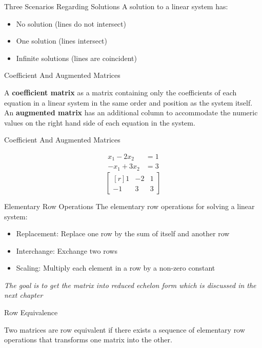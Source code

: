 \documentclass{beamer}
\begin{document}
\begin{frame}{Three Scenarios Regarding Solutions}
A solution to a linear system has:
\begin{itemize}
\item No solution (lines do not intersect)
\item One solution (lines intersect)
\item Infinite solutions (lines are coincident)
\end{itemize}
\end{frame}

\begin{frame}{Coefficient And Augmented Matrices}
\begin{definition}
  A \textbf{coefficient matrix} as a matrix containing only the coefficients of each equation in a linear system
  in the same order and position as the system itself. An \textbf{augmented matrix} has an additional column to 
  accommodate the numeric values on the right hand side of each equation in the system.
\end{definition}
\end{frame}

\begin{frame}{Coefficient And Augmented Matrices}
\begin{example}
\begin{equation}
\begin{split}
x_{1} - 2x_{2} &= 1 \\
-x_{1} + 3x_{2} &= 3
\end{split}
\end{equation}
\begin{equation}
\begin{bmatrix*}[r]
1 & -2 & 1 \\
-1 & 3 & 3 
\end{bmatrix*}
\end{equation}
\end{example}
\end{frame}

\begin{frame}{Elementary Row Operations}
The elementary row operations for solving a linear system:
\begin{itemize}
\item Replacement: Replace one row by the sum of itself and another row
\item Interchange: Exchange two rows
\item Scaling: Multiply each element in a row by a non-zero constant
\end{itemize}
\textit{The goal is to get the matrix into reduced echelon form which is discussed in the next chapter}
\end{frame}


\begin{frame}{Row Equivalence}
\begin{definition}
Two matrices are row equivalent if there exists a sequence of elementary row
operations that transforms one matrix into the other.
\end{definition}
\end{frame}
\end{document}
